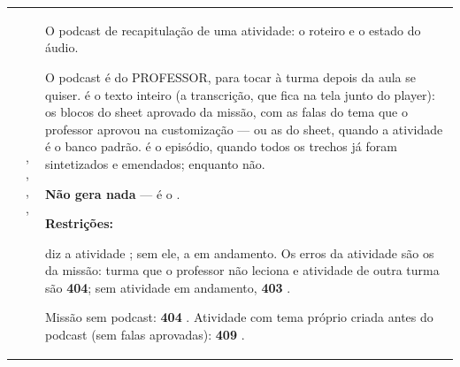 \begin{tabularx}{\linewidth}{@{}L{40mm}L{24mm}X@{}}
\toprule
\headrow {} &  & \\
\midrule
\endhead
{} & , , , ,  & O podcast de recapitulação de uma atividade: o roteiro e o estado do áudio.\par O podcast é do PROFESSOR, para tocar à turma depois da aula se quiser.  é o texto inteiro (a transcrição, que fica na tela junto do player): os blocos do sheet aprovado da missão, com as falas do tema que o professor aprovou na customização --- ou as do sheet, quando a atividade é o banco padrão.  é o episódio, quando todos os trechos já foram sintetizados e emendados;  enquanto não.\par \textbf{Não gera nada} --- é o .\par \textbf{Restrições:}\par \hspace*{1em}\textbullet{}  diz a atividade ; sem ele, a em andamento. Os erros da atividade são os da missão: turma que o professor não leciona e atividade de outra turma são \textbf{404}; sem atividade em andamento, \textbf{403} .\par \hspace*{1em}\textbullet{} Missão sem podcast: \textbf{404} . Atividade com tema próprio criada antes do podcast (sem falas aprovadas): \textbf{409} .\\

\end{tabularx}
